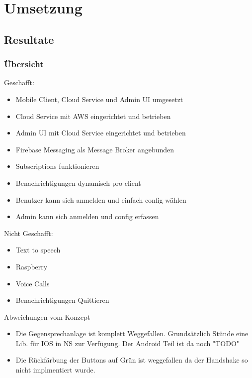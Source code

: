 \section{Umsetzung}\label{sec:umsetzung}

\subsection{Resultate}

\subsubsection{Übersicht}

Geschafft:

\begin{itemize}
    \item Mobile Client, Cloud Service und Admin UI umgesetzt
    \item Cloud Service mit AWS eingerichtet und betrieben
    \item Admin UI mit Cloud Service eingerichtet und betrieben
    \item Firebase Messaging als Message Broker angebunden
    \item Subscriptions funktionieren
    \item Benachrichtigungen dynamisch pro client
    \item Benutzer kann sich anmelden und einfach config wählen
    \item Admin kann sich anmelden und config erfassen
\end{itemize}

Nicht Geschafft:

\begin{itemize}
    \item Text to speech
    \item Raspberry
    \item Voice Calls
    \item Benachrichtigungen Quittieren
\end{itemize}

Abweichungen vom Konzept
\begin{itemize}
    \item Die Gegensprechanlage ist komplett Weggefallen.
    \subitem Grundsätzlich Stünde eine Lib. für IOS in NS zur Verfügung. Der Android Teil ist da noch "TODO"
    \item Die Rückfärbung der Buttons auf Grün ist weggefallen da der Handshake so nicht implmentiert wurde.
\end{itemize}

